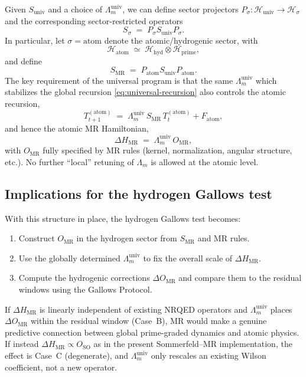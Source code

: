 \documentclass[11pt,a4paper]{article}
\newcommand{\DeltaHM}{\Delta H_{\mathrm{MR}}}
\newcommand{\LambdaMuniv}{\Lambda_{m}^{\mathrm{univ}}}
\newcommand{\OMR}{O_{\mathrm{MR}}}
\begin{document}
Given $S_{\text{univ}}$ and a choice of $\LambdaMuniv$, we can define
sector projectors $P_\sigma : \mathcal{H}_{\text{univ}} \to \mathcal{H}_\sigma$
and the corresponding sector-restricted operators
\begin{equation}
  S_\sigma
  \;=\;
  P_\sigma S_{\text{univ}} P_\sigma.
\end{equation}
In particular, let $\sigma = \text{atom}$ denote the atomic/hydrogenic
sector, with
\begin{equation}
  \mathcal{H}_{\text{atom}}
  \;\simeq\;
  \mathcal{H}_{\text{hyd}} \otimes \mathcal{H}_{\text{prime}},
\end{equation}
and define
\begin{equation}
  S_{\text{MR}}
  \;=\;
  P_{\text{atom}} S_{\text{univ}} P_{\text{atom}}.
\end{equation}
The key requirement of the universal program is that the same
$\LambdaMuniv$ which stabilizes the global recursion
\eqref{eq:universal-recursion} also controls the atomic recursion,
\begin{equation}
  T^{(\text{atom})}_{t+1}
  \;=\;
  \LambdaMuniv\, S_{\text{MR}}\, T^{(\text{atom})}_t + F_{\text{atom}},
\end{equation}
and hence the atomic MR Hamiltonian,
\begin{equation}
  \DeltaHM
  \;=\;
  \LambdaMuniv\,\OMR,
\end{equation}
with $\OMR$ fully specified by MR rules (kernel, normalization, angular
structure, etc.). No further ``local'' retuning of $\Lambda_m$ is
allowed at the atomic level.

\subsection{Implications for the hydrogen Gallows test}

With this structure in place, the hydrogen Gallows test becomes:
\begin{enumerate}[label=(\alph*)]
  \item Construct $\OMR$ in the hydrogen sector from $S_{\text{MR}}$ and
    MR rules.
  \item Use the globally determined $\LambdaMuniv$ to fix the overall
    scale of $\DeltaHM$.
  \item Compute the hydrogenic corrections $\Delta O_{\mathrm{MR}}$ and
    compare them to the residual windows using the Gallows Protocol.
\end{enumerate}
If $\DeltaHM$ is linearly independent of existing NRQED operators and
$\LambdaMuniv$ places $\Delta O_{\mathrm{MR}}$ within the residual
window (Case~B), MR would make a genuine predictive connection between
global prime-graded dynamics and atomic physics. If instead
$\DeltaHM \propto O_{\text{SO}}$ as in the present Sommerfeld--MR
implementation, the effect is Case~C (degenerate), and $\LambdaMuniv$
only rescales an existing Wilson coefficient, not a new operator.
\end{document}
